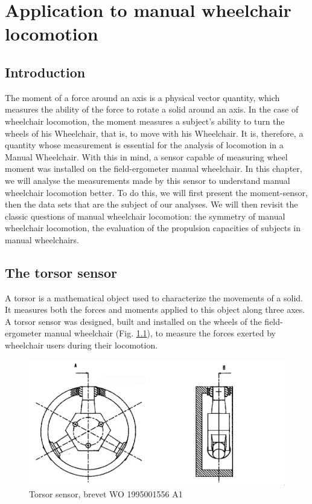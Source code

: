 \chapter[Application]{Application to manual wheelchair locomotion}
\label{application}
\section{Introduction}
The moment of a force around an axis is a physical vector quantity, which measures the ability of the force to rotate a solid around an axis. In the case of wheelchair locomotion, the moment measures a subject's ability to turn the wheels of his Wheelchair, that is, to move with his Wheelchair. It is, therefore, a quantity whose measurement is essential for the analysis of locomotion in a Manual Wheelchair. With this in mind, a sensor capable of measuring wheel moment was installed on the field-ergometer manual wheelchair.  In this chapter, we will analyse the measurements made by this sensor to understand manual wheelchair locomotion better. To do this, we will first present the moment-sensor, then the data sets that are the subject of our analyses. We will then revisit the classic questions of manual wheelchair locomotion: the symmetry of manual wheelchair locomotion, the evaluation of the propulsion capacities of subjects in manual wheelchairs.

\section{The torsor sensor}

A torsor is a mathematical object used to characterize the movements of a solid. It measures both the forces and moments applied to this object along three axes. A torsor sensor was designed, built and installed on the wheels of the field-ergometer manual wheelchair (Fig. \ref{capteur_tri_axe}), to measure the forces exerted by wheelchair users during their locomotion.

\begin{figure}[h]
\center
\includegraphics[scale = 0.4]{images/capteur_tri_axe}
\caption{Torsor sensor, brevet WO 1995001556 A1}
\label{capteur_tri_axe}
\end{figure}

